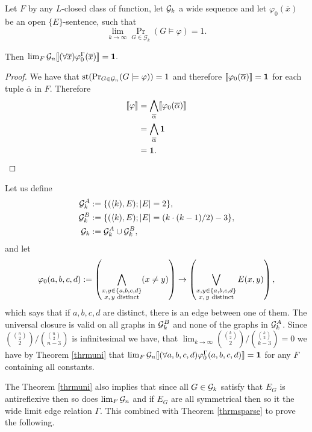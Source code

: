 \begin{thrm}\label{thrmuni}
Let $F$ by any $L$-closed class of function, let $\mathcal{G}_k$ a wide sequence and let $\varphi_0(\overline x)$ be an open $\{E\}$-sentence, such that
\[\lim_{k\to\infty}\Pr_{G\in\mathcal{G}_k}(G\models\varphi)=1.\]

Then $\lim_F \mathcal{G}_n \llbracket(\forall \overline x)\varphi_0^{\Gamma}(\overline x)\rrbracket=\textbf{1}.$


\end{thrm}

\begin{proof}
We have that $\text{st}(\Pr_{G\in\mathcal{G}_n}(G\models\varphi))=1$ and therefore $\llbracket\varphi_0(\overline\alpha)\rrbracket=\textbf{1}$ for each tuple $\overline\alpha$ in $F$. Therefore
\begin{align}
\llbracket\varphi\rrbracket&=\bigwedge_{\overline\alpha}\llbracket\varphi_0(\overline\alpha)\rrbracket\\
&=\bigwedge_{\overline\alpha}\textbf{1}\\
&=\textbf{1}.
\end{align}
\end{proof}

\begin{exam}
Let us define
\begin{align}
\mathcal{G}_k^{A}&:=\{(\langle k),E);\left|{E}\right|=2\},\\
\mathcal{G}_k^{B}&:=\{(\langle k),E);\left|{E}\right|=(k\cdot(k-1)/2)-3\},\\
\mathcal{G}_k&:=\mathcal{G}_k^{A}\cup\mathcal{G}_k^{B},
\end{align}
and let 
\[\varphi_0(a,b,c,d):=\left(\bigwedge_{\substack{x, y\in\{a,b,c,d\}\\\text{$x,y$ distinct}}}(x\not=y)\right)\to\left(\bigvee_{\substack{x, y\in\{a,b,c,d\}\\\text{$x,y$ distinct}}}E(x,y)\right),\]
which says that if $a,b,c,d$ are distinct, there is an edge between one of them. The universal closure is valid on all graphs in $\mathcal{G}_k^B$ and none of the graphs in $\mathcal{G}_k^A$. Since $\binom{\binom{n}{2}}{2}/\binom{\binom{n}{2}}{n-3}$ is infinitesimal we have, that $\lim_{k\to\infty} \binom{\binom{k}{2}}{2}/\binom{\binom{k}{2}}{k-3}=0$ we have by Theorem \ref{thrmuni} that $\lim_F \mathcal{G}_n \llbracket(\forall a,b,c,d)\varphi_0^\Gamma(a,b,c,d)\rrbracket=\textbf{1}$ for any $F$ containing all constants.
\end{exam}

The Theorem \ref{thrmuni} also implies that since all $G\in\mathcal{G}_k$ satisfy that $E_G$ is antireflexive then so does $\lim_{F}\mathcal{G}_n$ and if $E_G$ are all symmetrical then so it the wide limit edge relation $\Gamma$. This combined with Theorem \ref{thrmsparse} to prove the following.

